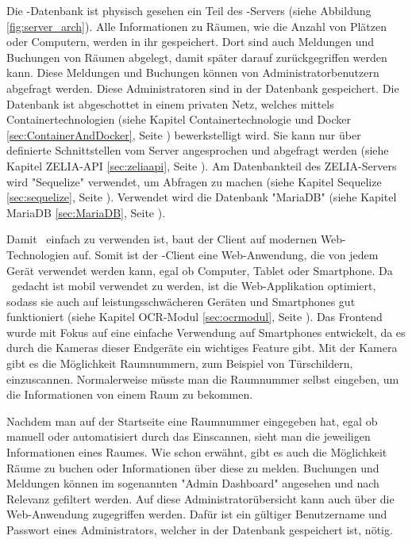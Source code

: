 Die \ZELIA-Datenbank ist physisch gesehen ein Teil des \ZELIA-Servers (siehe Abbildung \ref{fig:server_arch}). Alle Informationen zu Räumen, wie die Anzahl von Plätzen oder Computern, werden in ihr gespeichert. Dort sind auch Meldungen und Buchungen von Räumen abgelegt, damit später darauf zurückgegriffen werden kann. Diese Meldungen und Buchungen können von Administratorbenutzern abgefragt werden. Diese Administratoren sind in der Datenbank gespeichert. Die Datenbank ist abgeschottet in einem privaten Netz, welches mittels Containertechnologien (siehe Kapitel Containertechnologie und Docker \ref{sec:ContainerAndDocker}, Seite \pageref{sec:ContainerAndDocker}) bewerkstelligt wird. Sie kann nur über definierte Schnittstellen vom Server angesprochen und abgefragt werden (siehe Kapitel ZELIA-API \ref{sec:zeliaapi}, Seite \pageref{sec:zeliaapi}). Am Datenbankteil des ZELIA-Servers wird "Sequelize" verwendet, um Abfragen zu machen (siehe Kapitel Sequelize \ref{sec:sequelize}, Seite \pageref{sec:sequelize}). Verwendet wird die Datenbank "MariaDB" (siehe Kapitel MariaDB \ref{sec:MariaDB}, Seite \pageref{sec:sequelize}).



Damit \ZELIA\ einfach zu verwenden ist, baut der Client auf modernen Web-\linebreak Technologien auf. Somit ist der \ZELIA-Client eine Web-Anwendung,  die von jedem Gerät verwendet werden kann, egal ob Computer, Tablet oder Smartphone. Da \ZELIA\ gedacht ist mobil verwendet zu werden, ist die Web-Applikation optimiert, sodass sie auch auf leistungsschwächeren Geräten und Smartphones gut funktioniert (siehe Kapitel OCR-Modul \ref{sec:ocrmodul}, Seite \pageref{sec:ocrmodul}). Das Frontend wurde mit Fokus auf eine einfache Verwendung auf Smartphones entwickelt, da es durch die Kameras dieser Endgeräte ein wichtiges Feature gibt. Mit der Kamera gibt es die Möglichkeit Raumnummern, zum Beispiel von Türschildern, einzuscannen. Normalerweise müsste man die Raumnummer selbst eingeben, um die Informationen von einem Raum zu bekommen. 

Nachdem man auf der Startseite eine Raumnummer eingegeben hat, egal ob manuell oder automatisiert durch das Einscannen, sieht man die jeweiligen Informationen eines Raumes. Wie schon erwähnt, gibt es auch die Möglichkeit Räume zu buchen oder Informationen über diese zu melden. Buchungen und Meldungen können im sogenannten "Admin Dashboard" angesehen und nach Relevanz gefiltert werden. Auf diese Administratorübersicht kann auch über die Web-Anwendung zugegriffen werden. Dafür ist ein gültiger Benutzername und Passwort eines Administrators, welcher in der Datenbank gespeichert ist, nötig.

